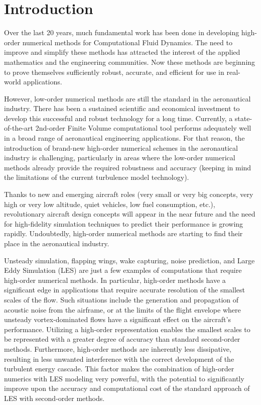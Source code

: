 
\section{Introduction}

Over the last 20 years, much fundamental work has been done in developing high-order numerical methods for Computational Fluid Dynamics. The need to improve and simplify these methods has attracted the interest of the applied mathematics and the engineering communities. Now these methods are beginning to prove themselves sufficiently robust, accurate, and efficient for use in real-world applications.

However, low-order numerical methods are still the standard in the aeronautical industry. There has been a sustained scientific and economical investment to develop this successful and robust technology for a long time. Currently, a state-of-the-art 2nd-order Finite Volume computational tool performs adequately well in a broad range of aeronautical engineering applications. For that reason, the introduction of brand-new high-order numerical schemes in the aeronautical industry is challenging, particularly in areas where the low-order numerical methods already provide the required robustness and accuracy (keeping in mind the limitations of the current turbulence model technology).

Thanks to new and emerging aircraft roles (very small or very big concepts, very high or very low altitude, quiet vehicles, low fuel consumption, etc.), revolutionary aircraft design concepts will appear in the near future and the need for high-fidelity simulation techniques to predict their performance is growing rapidly. Undoubtedly, high-order numerical methods are starting to find their place in the aeronautical industry. 

Unsteady simulation, flapping wings, wake capturing, noise prediction, and Large Eddy Simulation (LES) are just a few examples of computations that require high-order numerical methods. In particular, high-order methods have a significant edge in applications that require accurate resolution of the smallest scales of the flow. Such situations include the generation and propagation of acoustic noise from the airframe, or at the limits of the flight envelope where unsteady vortex-dominated flows have a significant effect on the aircraft's performance. Utilizing a high-order representation enables the smallest scales to be represented with a greater degree of accuracy than standard second-order methods. Furthermore, high-order methods are inherently less dissipative, resulting in less unwanted interference with the correct development of the turbulent energy cascade. This factor makes the combination of high-order numerics with LES modeling very powerful, with the potential to significantly improve upon the accuracy and computational cost of the standard approach of LES with second-order methods.

